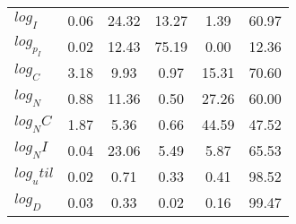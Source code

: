 \begin{center}
\begin{longtable}{lccccc}
$log_I     $	 & 	        0.06	 & 	       24.32	 & 	       13.27	 & 	        1.39	 & 	       60.97 \\ 
$log_p_I   $	 & 	        0.02	 & 	       12.43	 & 	       75.19	 & 	        0.00	 & 	       12.36 \\ 
$log_C     $	 & 	        3.18	 & 	        9.93	 & 	        0.97	 & 	       15.31	 & 	       70.60 \\ 
$log_N     $	 & 	        0.88	 & 	       11.36	 & 	        0.50	 & 	       27.26	 & 	       60.00 \\ 
$log_NC    $	 & 	        1.87	 & 	        5.36	 & 	        0.66	 & 	       44.59	 & 	       47.52 \\ 
$log_NI    $	 & 	        0.04	 & 	       23.06	 & 	        5.49	 & 	        5.87	 & 	       65.53 \\ 
$log_util  $	 & 	        0.02	 & 	        0.71	 & 	        0.33	 & 	        0.41	 & 	       98.52 \\ 
$log_D     $	 & 	        0.03	 & 	        0.33	 & 	        0.02	 & 	        0.16	 & 	       99.47 \\ 
\end{longtable}
 \end{center}
